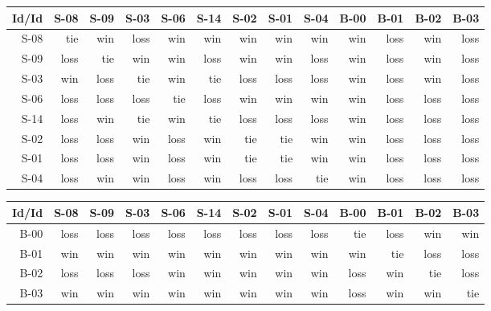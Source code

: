 \begin{tabular}{ | r | r | r | r | r | r | r | r | r | r | r | r | r | }
    \hline
        Id/Id  &   S-08  &   S-09  &   S-03  &   S-06  &   S-14  &   S-02  &   S-01  &   S-04  &   B-00  &   B-01  &   B-02  &   B-03  \\
    \hline
    \hline
         S-08  &    tie  &    win  &   loss  &    win  &    win  &    win  &    win  &    win  &    win  &   loss  &    win  &   loss  \\
    \hline
         S-09  &   loss  &    tie  &    win  &    win  &   loss  &    win  &    win  &   loss  &    win  &   loss  &    win  &   loss  \\
    \hline
         S-03  &    win  &   loss  &    tie  &    win  &    tie  &   loss  &   loss  &   loss  &    win  &   loss  &    win  &   loss  \\
    \hline
         S-06  &   loss  &   loss  &   loss  &    tie  &   loss  &    win  &    win  &    win  &    win  &   loss  &   loss  &   loss  \\
    \hline
         S-14  &   loss  &    win  &    tie  &    win  &    tie  &   loss  &   loss  &   loss  &    win  &   loss  &   loss  &   loss  \\
    \hline
         S-02  &   loss  &   loss  &    win  &   loss  &    win  &    tie  &    tie  &    win  &    win  &   loss  &   loss  &   loss  \\
    \hline
         S-01  &   loss  &   loss  &    win  &   loss  &    win  &    tie  &    tie  &    win  &    win  &   loss  &   loss  &   loss  \\
    \hline
         S-04  &   loss  &    win  &    win  &   loss  &    win  &   loss  &   loss  &    tie  &    win  &   loss  &   loss  &   loss  \\
    \hline
\end{tabular}


\begin{tabular}{ | r | r | r | r | r | r | r | r | r | r | r | r | r | }
    \hline
        Id/Id  &   S-08  &   S-09  &   S-03  &   S-06  &   S-14  &   S-02  &   S-01  &   S-04  &   B-00  &   B-01  &   B-02  &   B-03  \\
    \hline
    \hline
         B-00  &   loss  &   loss  &   loss  &   loss  &   loss  &   loss  &   loss  &   loss  &    tie  &   loss  &    win  &    win  \\
    \hline
         B-01  &    win  &    win  &    win  &    win  &    win  &    win  &    win  &    win  &    win  &    tie  &   loss  &   loss  \\
    \hline
         B-02  &   loss  &   loss  &   loss  &    win  &    win  &    win  &    win  &    win  &   loss  &    win  &    tie  &   loss  \\
    \hline
         B-03  &    win  &    win  &    win  &    win  &    win  &    win  &    win  &    win  &   loss  &    win  &    win  &    tie  \\
    \hline
\end{tabular}


